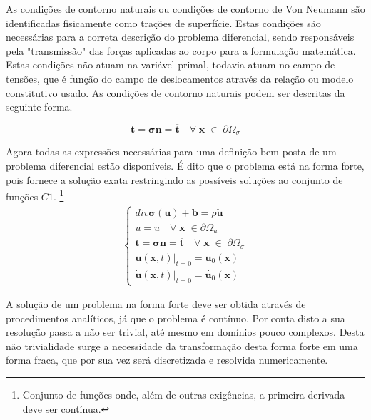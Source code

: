 As condições de contorno naturais ou condições de contorno de Von Neumann são identificadas fisicamente como trações de superfície. Estas condições são necessárias para a correta descrição do problema diferencial, sendo responsáveis pela "transmissão" das forças aplicadas ao corpo para a formulação matemática. Estas condições não atuam na variável primal, todavia atuam no campo de tensões, que é função do campo de deslocamentos através da relação ou modelo constitutivo usado. As condições de contorno naturais podem ser descritas da seguinte forma.

\begin{equation}
	\boldsymbol{t} = \boldsymbol{\sigma}\boldsymbol{n} = \boldsymbol{\overline{t}} \quad \forall \; \boldsymbol{x} \; \in \; \partial \Omega_{\sigma}
\end{equation}

Agora todas as expressões necessárias para uma definição bem posta de um problema diferencial estão disponíveis. É dito que o problema está na forma forte, pois fornece a solução exata restringindo as possíveis soluções ao conjunto de funções $C1$. \footnote{Conjunto de funções onde, além de outras exigências, a primeira derivada deve ser contínua.}
\begin{align}
    \begin{cases}
	div\boldsymbol{\sigma(\boldsymbol{u})} + \boldsymbol{b} = \rho \ddot{\boldsymbol{u}}\\
	u = \overline{u} \quad \forall \; \boldsymbol{x} \; \in  \partial \Omega_u\\
	\boldsymbol{t} = \boldsymbol{\sigma}\boldsymbol{n} = \boldsymbol{\overline{t}} \quad \forall \; \boldsymbol{x} \; \in \; \partial \Omega_{\sigma} \\
	\boldsymbol{u}(\boldsymbol{x},t)|_{t=0} = \boldsymbol{u}_{0}(\boldsymbol{x}) \\
	\dot{\boldsymbol{u}}(\boldsymbol{x},t)|_{t=0} = \dot{\boldsymbol{u}_{0}}(\boldsymbol{x})
	\end{cases}
\end{align}

A solução de um problema na forma forte deve ser obtida através de procedimentos analíticos, já que o problema é contínuo. Por conta disto a sua resolução passa a não ser trivial, até mesmo em domínios pouco complexos. Desta não trivialidade surge a necessidade da transformação desta forma forte em uma forma fraca, que por sua vez será discretizada e resolvida numericamente.

